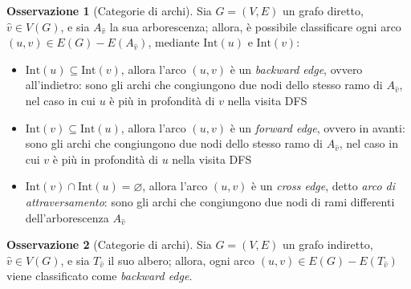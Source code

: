 \documentclass[14pt]{extreport}
\theoremstyle{definition}
\theoremstyle{definition}
\newtheorem{remark}{Osservazione}[subsection]
\begin{document}
\begin{remark}[Categorie di archi]
    Sia $G= (V, E)$ un grafo diretto, $\hat v \in V(G)$, e sia $A_{\hat v}$ la sua arborescenza; allora, è possibile classificare ogni arco $(u, v) \in E(G) - E(A_{\hat v})$, mediante $\mathrm{Int}(u)$ e $\mathrm{Int}(v)$:
    \begin{itemize}
        \item $\mathrm{Int}(u) \subseteq \mathrm{Int}(v)$, allora l'arco $(u, v)$ è un \textit{backward edge}, ovvero all'indietro: sono gli archi che congiungono due nodi dello stesso ramo di $A_{\hat v}$, nel caso in cui $u$ è più in profondità di $v$ nella visita DFS 
        \item $\mathrm{Int}(v) \subseteq \mathrm{Int}(u)$, allora l'arco $(u, v)$ è un \textit{forward edge}, ovvero in avanti: sono gli archi che congiungono due nodi dello stesso ramo di $A_{\hat v}$, nel caso in cui $v$ è più in profondità di $u$ nella visita DFS
        \item $\mathrm{Int}(v) \cap \mathrm{Int}(u) = \varnothing$, allora l'arco $(u, v)$ è un \textit{cross edge}, detto \textit{arco di attraversamento}: sono gli archi che congiungono due nodi di rami differenti dell'arborescenza $A_{\hat v}$
    \end{itemize}
\end{remark}

\begin{remark}[Categorie di archi]
    Sia $G=(V, E)$ un grafo indiretto, $\hat v \in V(G)$, e sia $T_{\hat v}$ il suo albero; allora, ogni arco $(u, v) \in E(G) - E(T_{\hat v})$ viene classificato come \textit{backward edge}.
\end{remark}
\end{document}
